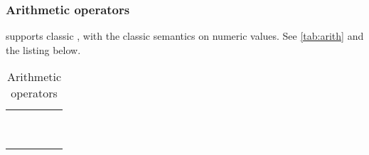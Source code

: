 \subsubsection{Arithmetic operators}

\us supports classic , with the classic
semantics on numeric values. See \autoref{tab:arith} and the listing
below.

\newcommand{\whetherHtml}[2]{%
  \ifx\ifHtml\undefined%
    #2%
  \else%
    #1%
  \fi%
}

\newenvironment{operatorTabular}
{
  \begin{tabular}{|*{5}{c|}}
    \hline
    \strong{\whetherHtml{Operator}{Oper.}}
    & \strong{Syntax}
    & \strong{\whetherHtml{Associativity}{Assoc.}}
    & \strong{Semantics}
    & \strong{Equivalence}
    \\
    \hline
  }{
    \\
    \hline
  \end{tabular}
}

\newenvironment{operatorTable}[2]
{
  \def\operatorTableLabel{#1}%
  \def\operatorTableCaption{#2}%
  \begin{table}[\floatposh]
    \centering
    \begin{operatorTabular}
    }{
    \end{operatorTabular}
    \caption{\operatorTableCaption}
    \label{\operatorTableLabel}
  \end{table}
}

\begin{operatorTable}{tab:arith}{Arithmetic operators}
  \operatoruplus\\
  \operatorumin \\
  \hline
  \operatorexp\\
  \hline
  \operatormult\\
  \operatordiv\\
  \operatormod\\
  \hline
  \operatorplus\\
  \operatorminus\\
\end{operatorTable}

